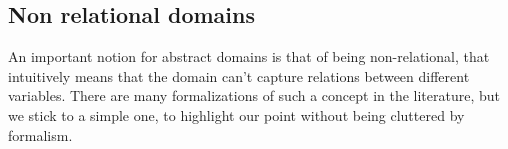 %
%	

\subsection{Non relational domains}

An important notion for abstract domains is that of being non-relational, that intuitively means that the domain can't capture relations between different variables. There are many formalizations of such a concept in the literature, but we stick to a simple one, to highlight our point without being cluttered by formalism.

